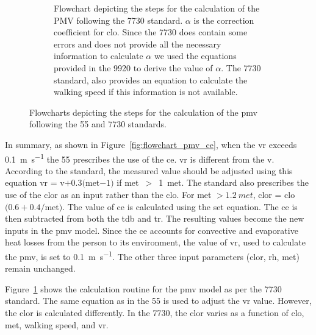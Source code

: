 \begin{figure}[!htb]
\begin{subfigure}[b]{\textwidth}
        \caption{Flowchart depicting the steps for the calculation of the PMV following the \gls{7730} standard.
            $\alpha$ is the correction coefficient for \acs{clo}.
            Since the \gls{7730} does contain some errors and does not provide all the necessary information to calculate $\alpha$ we used the equations provided in the \gls{9920} to derive the value of $\alpha$.
        The \gls{7730} standard, also provides an equation to calculate the walking speed if this information is not available.
        }
        \label{fig:flowchart_pmv_iso}
    \end{subfigure}
    \caption{Flowcharts depicting the steps for the calculation of the \ac{pmv} following the \gls{55} and \gls{7730} standards.}
    \label{fig:flowchart_pmv_calculation}
\end{figure}
In summary, as shown in Figure~\ref{fig:flowchart_pmv_ce}, when the \ac{vr} exceeds \qty{0.1}{\m\per\s} the \gls{55} prescribes the use of the \ac{ce}.
\ac{vr} is different from the \ac{v}.
According to the standard, the measured value should be adjusted using this equation \ac{vr} = \ac{v}$+ 0.3 ($\acs{met}$-1)$ if \ac{met}~$>$~\qty{1}{met}.
The standard also prescribes the use of the \ac{clor} as an input rather than the \ac{clo}.
For \ac{met} $> \qty{1.2}{met}$, \acs{clor} = \acs{clo}$(0.6 + 0.4/$\acs{met}$)$.
The value of \ac{ce} is calculated using the \ac{set} equation.
The \ac{ce} is then subtracted from both the \ac{tdb} and \ac{tr}.
The resulting values become the new inputs in the \ac{pmv} model.
Since the \ac{ce} accounts for convective and evaporative heat losses from the person to its environment, the value of \ac{vr}, used to calculate the \ac{pmv}, is set to \qty{0.1}{\m\per\s}.
The other three input parameters (\ac{clor}, \ac{rh}, \ac{met}) remain unchanged.

Figure~\ref{fig:flowchart_pmv_iso} shows the calculation routine for the \ac{pmv} model as per the \gls{7730} standard.
The same equation as in the \gls{55} is used to adjust the \ac{vr} value.
However, the \ac{clor} is calculated differently.
In the \gls{7730}, the \ac{clor} varies as a function of \ac{clo}, \ac{met}, walking speed, and \ac{vr}.

